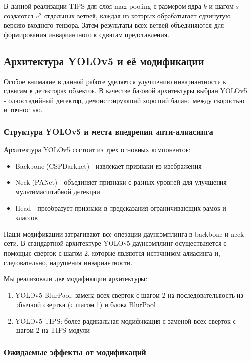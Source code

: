В данной реализации TIPS для слоя max-pooling с размером ядра $k$ и шагом $s$ создаются $s^2$ отдельных ветвей, каждая из которых обрабатывает сдвинутую версию входного тензора. Затем результаты всех ветвей объединяются для формирования инвариантного к сдвигам представления.

\subsection{Архитектура YOLOv5 и её модификации}
\label{sec:yolov5}

Особое внимание в данной работе уделяется улучшению инвариантности к сдвигам в детекторах объектов. В качестве базовой архитектуры выбран YOLOv5 - одностадийный детектор, демонстрирующий хороший баланс между скоростью и точностью.

\subsubsection{Структура YOLOv5 и места внедрения анти-алиасинга}
\label{sec:yolov5:structure}

Архитектура YOLOv5 состоит из трех основных компонентов:
\begin{itemize}
    \item Backbone (CSPDarknet) - извлекает признаки из изображения
    \item Neck (PANet) - объединяет признаки с разных уровней для улучшения мультимасштабной детекции
    \item Head - преобразует признаки в предсказания ограничивающих рамок и классов
\end{itemize}

Наши модификации затрагивают все операции даунсэмплинга в backbone и neck сети. В стандартной архитектуре YOLOv5 даунсэмплинг осуществляется с помощью сверток с шагом 2, которые являются источником алиасинга и, следовательно, нарушения инвариантности.

Мы реализовали две модификации архитектуры:
\begin{enumerate}
    \item YOLOv5-BlurPool: замена всех сверток с шагом 2 на последовательность из обычной свертки (с шагом 1) и блока BlurPool
    \item YOLOv5-TIPS: более радикальная модификация с заменой всех сверток с шагом 2 на TIPS-модули
\end{enumerate}

\subsubsection{Ожидаемые эффекты от модификаций}
\label{sec:yolov5:effects}

